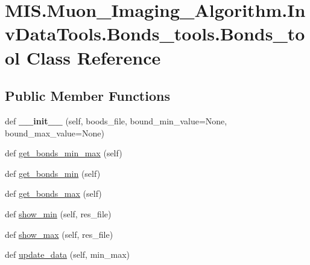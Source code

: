 \hypertarget{classMIS_1_1Muon__Imaging__Algorithm_1_1InvDataTools_1_1Bonds__tools_1_1Bonds__tool}{}\section{M\+I\+S.\+Muon\+\_\+\+Imaging\+\_\+\+Algorithm.\+Inv\+Data\+Tools.\+Bonds\+\_\+tools.\+Bonds\+\_\+tool Class Reference}
\label{classMIS_1_1Muon__Imaging__Algorithm_1_1InvDataTools_1_1Bonds__tools_1_1Bonds__tool}
\subsection*{Public Member Functions}
\begin{DoxyCompactItemize}
\item 
\mbox{\label{classMIS_1_1Muon__Imaging__Algorithm_1_1InvDataTools_1_1Bonds__tools_1_1Bonds__tool_ac4a3f789dde3d4dc1733bf1c53c51934}} 
def {\bfseries \+\_\+\+\_\+init\+\_\+\+\_\+} (self, boods\+\_\+file, bound\+\_\+min\+\_\+value=None, bound\+\_\+max\+\_\+value=None)
\item 
def \hyperlink{classMIS_1_1Muon__Imaging__Algorithm_1_1InvDataTools_1_1Bonds__tools_1_1Bonds__tool_aec296285ead04b99a3161d606dce0a72}{get\+\_\+bonds\+\_\+min\+\_\+max} (self)
\item 
def \hyperlink{classMIS_1_1Muon__Imaging__Algorithm_1_1InvDataTools_1_1Bonds__tools_1_1Bonds__tool_ab264fef53815bccf40124fbce00ba480}{get\+\_\+bonds\+\_\+min} (self)
\item 
def \hyperlink{classMIS_1_1Muon__Imaging__Algorithm_1_1InvDataTools_1_1Bonds__tools_1_1Bonds__tool_ab6271f20a253e398dd2b9a79d5e96271}{get\+\_\+bonds\+\_\+max} (self)
\item 
def \hyperlink{classMIS_1_1Muon__Imaging__Algorithm_1_1InvDataTools_1_1Bonds__tools_1_1Bonds__tool_ae9fb0739083516ae3bf749db99f462cb}{show\+\_\+min} (self, res\+\_\+file)
\item 
def \hyperlink{classMIS_1_1Muon__Imaging__Algorithm_1_1InvDataTools_1_1Bonds__tools_1_1Bonds__tool_aa9fd09e90238dd3af4fd569fe4aaac10}{show\+\_\+max} (self, res\+\_\+file)
\item 
def \hyperlink{classMIS_1_1Muon__Imaging__Algorithm_1_1InvDataTools_1_1Bonds__tools_1_1Bonds__tool_ada1e06c4bdf1524803599a9bd3f96e14}{update\+\_\+data} (self, min\+\_\+max)
\end{DoxyCompactItemize}
